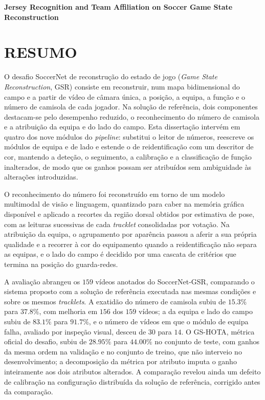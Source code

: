 \begingroup
\begin{flushleft}
\bfseries
{}
{\Large
Jersey Recognition and Team Affiliation on Soccer Game State Reconstruction}

\mdseries
\end{flushleft}
\normalsize
\let\clearpage\relax
\chapter{RESUMO}
\endgroup

\noindent O desafio SoccerNet de reconstrução do estado de jogo (\emph{Game State Reconstruction},
GSR) consiste em reconstruir, num mapa bidimensional do campo e a partir de vídeo de câmara única,
a posição, a equipa, a função e o número de camisola de cada jogador. Na solução de referência, dois
componentes destacam-se pelo desempenho reduzido, o reconhecimento do número de camisola e a
atribuição da equipa e do lado do campo. Esta dissertação intervém em quatro dos nove módulos do
\emph{pipeline}: substitui o leitor de números, reescreve os módulos de equipa e de lado e estende
o de reidentificação com um descritor de cor, mantendo a deteção, o seguimento, a calibração e a
classificação de função inalterados, de modo que os ganhos possam ser atribuídos sem ambiguidade às
alterações introduzidas.

O reconhecimento do número foi reconstruído em torno de um modelo multimodal de visão e linguagem,
quantizado para caber na memória gráfica disponível e aplicado a recortes da região dorsal obtidos
por estimativa de pose, com as leituras sucessivas de cada \emph{tracklet} consolidadas por votação.
Na atribuição da equipa, o agrupamento por aparência passou a aferir a sua própria qualidade e a
recorrer à cor do equipamento quando a reidentificação não separa as equipas, e o lado do campo é
decidido por uma cascata de critérios que termina na posição do guarda-redes.

A avaliação abrangeu os $159$ vídeos anotados do SoccerNet-GSR, comparando o sistema proposto com a
solução de referência executada nas mesmas condições e sobre os mesmos \emph{tracklets}. A exatidão
do número de camisola subiu de $15.3\%$ para $37.8\%$, com melhoria em $156$ dos
$159$ vídeos; a da equipa e lado do campo subiu de $83.1\%$ para $91.7\%$, e o número de
vídeos em que o módulo de equipa falha, avaliado por inspeção visual, desceu de $30$
para $14$. O GS-HOTA, métrica oficial do desafio, subiu de $28.95\%$ para
$44.00\%$ no conjunto de teste, com ganhos da mesma ordem na validação e no conjunto de treino,
que não interveio no desenvolvimento; a decomposição da métrica por atributo imputa o ganho
inteiramente aos dois atributos alterados. A comparação revelou ainda um defeito de calibração na
configuração distribuída da solução de referência, corrigido antes da comparação.

